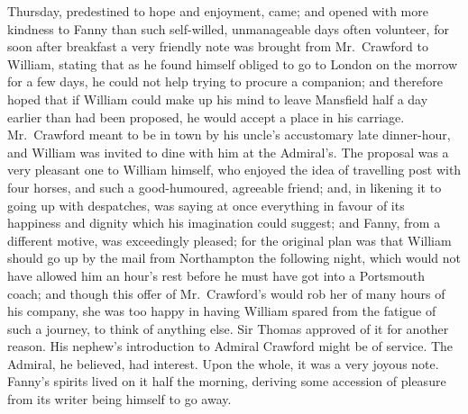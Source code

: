 \documentclass{article}
\begin{document}
Thursday, predestined to hope and enjoyment, came; and opened
with more kindness to Fanny than such self-willed,
unmanageable days often volunteer, for soon after breakfast
a very friendly note was brought from Mr.\ Crawford
to William, stating that as he found himself obliged
to go to London on the morrow for a few days, he could
not help trying to procure a companion; and therefore
hoped that if William could make up his mind to leave
Mansfield half a day earlier than had been proposed,
he would accept a place in his carriage.  Mr.\ Crawford meant
to be in town by his uncle's accustomary late dinner-hour,
and William was invited to dine with him at the Admiral's.
The proposal was a very pleasant one to William himself,
who enjoyed the idea of travelling post with four horses,
and such a good-humoured, agreeable friend; and, in likening
it to going up with despatches, was saying at once everything
in favour of its happiness and dignity which his imagination
could suggest; and Fanny, from a different motive,
was exceedingly pleased; for the original plan was that
William should go up by the mail from Northampton the
following night, which would not have allowed him an hour's
rest before he must have got into a Portsmouth coach;
and though this offer of Mr.\ Crawford's would rob her
of many hours of his company, she was too happy in having
William spared from the fatigue of such a journey,
to think of anything else.  Sir Thomas approved of it
for another reason.  His nephew's introduction to Admiral
Crawford might be of service.  The Admiral, he believed,
had interest.  Upon the whole, it was a very joyous note.
Fanny's spirits lived on it half the morning, deriving
some accession of pleasure from its writer being himself to go
away.
\end{document}
